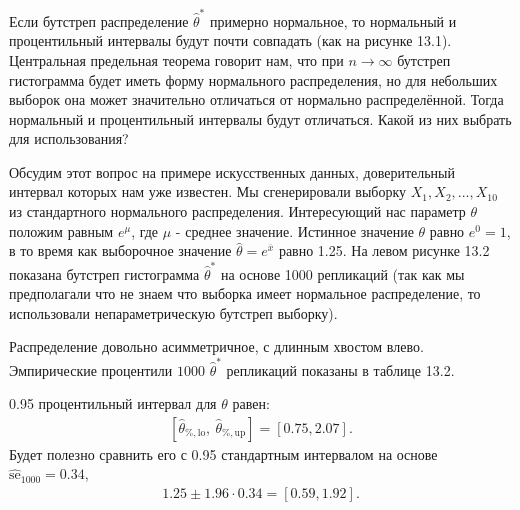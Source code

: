 Если бутстреп распределение $\widehat{\theta}^{*}$ примерно нормальное, то нормальный и процентильный интервалы будут почти совпадать (как на рисунке 13.1). Центральная предельная теорема говорит нам, что при $n \to \infty $ бутстреп гистограмма будет иметь форму нормального распределения, но для небольших выборок она может значительно отличаться от нормально распределённой. Тогда нормальный и процентильный интервалы будут отличаться. Какой из них выбрать для использования?

Обсудим этот вопрос на примере искусственных данных, доверительный интервал которых нам уже известен. Мы сгенерировали выборку $X_{1}, X_{2},...,X_{10}$ из стандартного нормального распределения. Интересующий нас параметр $\theta$ положим равным $e^{\mu}$, где $\mu$ - среднее значение. Истинное значение $\theta$ равно $e^{0} = 1$, в то время как
выборочное значение $\widehat{\theta} = e^{\overline{x}}$ равно 1.25. На левом рисунке 13.2 показана бутстреп гистограмма  $\widehat{\theta}^{*}$ на основе 1000 репликаций (так как мы предполагали что не знаем что выборка имеет нормальное распределение, то использовали непараметрическую бутстреп выборку).

Распределение довольно асимметричное, с длинным хвостом влево. Эмпирические процентили $1000$ $\widehat{\theta}^{*}$ репликаций показаны в таблице 13.2.

\begin{figure}[H]
\end{figure}

0.95 процентильный интервал  для $\theta$ равен:
\begin{gather}\label{13.6}
[\widehat{\theta}_{\%, \text{lo}}, \ \widehat{\theta}_{\%, \text{up}}] = [0.75, 2.07].
\end{gather}
Будет полезно сравнить его с 0.95 стандартным интервалом на основе $\widehat{\text{se}}_{1000} = 0.34$,
\begin{gather}\label{13.7}
1.25 \pm 1.96\cdot 0.34 = [0.59, 1.92].
\end{gather}


